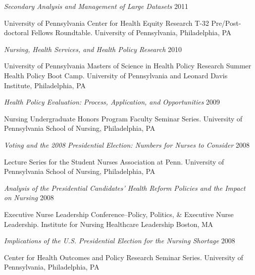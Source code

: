 \documentclass[10pt,]{article}
\begin{document}
{{{{{{{{{{{{{{\begin{hangparas}{.5in}{1}
{\textit {Secondary Analysis and Management of Large Datasets}} \hfill 2011 
\vspace{-2.5mm}
\begin{adjustwidth}{0.5cm}{1cm}
University of Pennsylvania Center for Health Equity Research T-32 Pre/Post-doctoral Fellows Roundtable. University of Pennsylvania, Philadelphia, PA
\end{adjustwidth}

{\textit {Nursing, Health Services, and Health Policy Research}} \hfill 2010 
\vspace{-2.5mm}
\begin{adjustwidth}{0.5cm}{1cm}
University of Pennsylvania Masters of Science in Health Policy Research Summer Health Policy Boot Camp. University of Pennsylvania and Leonard Davis Institute, Philadelphia, PA
\end{adjustwidth}

{\textit {Health Policy Evaluation: Process, Application, and Opportunities}} \hfill 2009 
\vspace{-2.5mm}
\begin{adjustwidth}{0.5cm}{1cm}
Nursing Undergraduate Honors Program Faculty Seminar Series. University of Pennsylvania School of Nursing, Philadelphia, PA
\end{adjustwidth}

{\textit {Voting and the 2008 Presidential Election: Numbers for Nurses to Consider}} \hfill 2008 
\vspace{-2.5mm}
\begin{adjustwidth}{0.5cm}{1cm}
Lecture Series for the Student Nurses Association at Penn. University of Pennsylvania School of Nursing, Philadelphia, PA
\end{adjustwidth}

{\textit {Analysis of the Presidential Candidates’ Health Reform Policies and the Impact on Nursing}} \hfill 2008 
\vspace{-2.5mm}
\begin{adjustwidth}{0.5cm}{1cm}
Executive Nurse Leadership Conference–Policy, Politics, \& Executive Nurse Leadership. Institute for Nursing Healthcare Leadership Boston, MA
\end{adjustwidth}

{\textit {Implications of the U.S. Presidential Election for the Nursing Shortage}} \hfill 2008 
\vspace{-2.5mm}
\begin{adjustwidth}{0.5cm}{1cm}
Center for Health Outcomes and Policy Research Seminar Series. University of Pennsylvania, Philadelphia, PA
\end{adjustwidth}


\end{hangparas}}}}}}}}}}}}}}}
\end{document}
